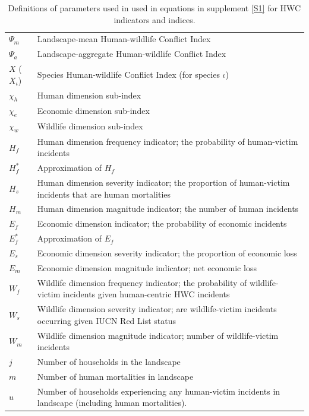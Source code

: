 \documentclass[fleqn,10pt]{olplainarticle}
\begin{document}
\begin{table}[!ht]
    \centering
    \caption{Definitions of parameters used in used in equations in supplement \ref{S1} for HWC indicators and indices.}
    \label{tab:index_params}
    \begin{tabular}{p{1cm} p{13cm}}
         $\Psi_m$ & Landscape-mean Human-wildlife Conflict Index \\
         $\Psi_a$ & Landscape-aggregate Human-wildlife Conflict Index \\
         $X$ ($X_\iota$) &	Species Human-wildlife Conflict Index (for species $\iota$) \\
         $\chi_h$ &	Human dimension sub-index \\
         $\chi_e$ &	Economic dimension sub-index \\
         $\chi_w$ &	Wildlife dimension sub-index \\
         $H_f$ &	Human dimension frequency indicator; the probability of human-victim incidents \\
         $H_f^\ast$ &  Approximation of $H_f$ \\
         $H_s$ &	Human dimension severity indicator; the proportion of human-victim incidents that are human mortalities \\
         $H_m$ &	Human dimension magnitude indicator; the number of human incidents \\
         $E_f$ &	Economic dimension indicator; the probability of economic incidents \\
         $E_f^\ast$ &  Approximation of $E_f$ \\
         $E_s$ &	Economic dimension severity indicator; the proportion of economic loss \\
         $E_m$ &	Economic dimension magnitude indicator; net economic loss \\
         $W_f$ &	Wildlife dimension frequency indicator; the probability of wildlife-victim incidents given human-centric HWC incidents \\
         $W_s$ &	Wildlife dimension severity indicator; are wildlife-victim incidents occurring given IUCN Red List status  \\
         $W_m$ &	Wildlife dimension magnitude indicator; number of wildlife-victim incidents \\
         $j$ & Number of households in the landscape \\
         $m$ &	Number of human mortalities in landscape \\
         $u$ &	Number of households experiencing any human-victim incidents in landscape (including human mortalities). \\

\end{tabular}
\end{table}
\end{document}
